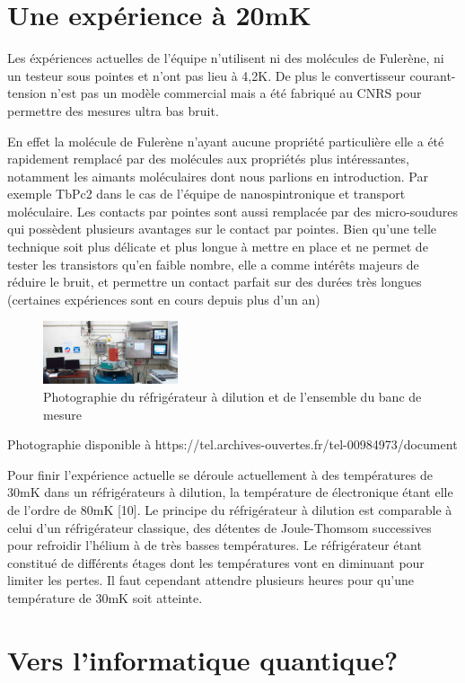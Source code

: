 \section{Une expérience à 20mK}
Les éxpériences actuelles de l’équipe n’utilisent ni des molécules de Fulerène, ni un testeur sous pointes et n’ont pas lieu à 4,2K. De plus le convertisseur courant-tension n’est pas un modèle commercial mais a été fabriqué au CNRS pour permettre des mesures ultra bas bruit.

En effet la molécule de Fulerène n’ayant aucune propriété particulière elle a été rapidement remplacé par des molécules aux propriétés plus intéressantes, notamment les aimants moléculaires dont nous parlions en introduction. Par exemple TbPc2 dans le cas de l’équipe de nanospintronique et transport moléculaire.
Les contacts par pointes sont aussi remplacée par des micro-soudures qui possèdent plusieurs avantages sur le contact par pointes. Bien qu’une telle technique soit plus délicate et plus longue à mettre en place et ne permet de tester les transistors qu’en faible nombre, elle a comme intérêts majeurs de réduire le bruit, et permettre un contact parfait sur des durées très longues (certaines expériences sont en cours depuis plus d’un an)

\begin{figure}[h]
    \begin{center}
        \includegraphics[width=150px]{Photos/Refrigerateur_dillution.png}
        \caption{Photographie du réfrigérateur à dilution et de l’ensemble du banc de mesure}
        \label{fig:}
    \end{center}
\end{figure}
Photographie disponible à https://tel.archives-ouvertes.fr/tel-00984973/document

Pour finir l’expérience actuelle se déroule actuellement à des températures de 30mK dans un réfrigérateurs à dilution, la température de électronique étant elle de l’ordre de 80mK [10]. Le principe du réfrigérateur à dilution est comparable à celui d’un réfrigérateur classique, des détentes de Joule-Thomsom successives pour refroidir l’hélium à de très basses températures. Le réfrigérateur étant constitué de différents étages dont les températures vont en diminuant pour limiter les pertes. Il faut cependant attendre plusieurs heures pour qu’une température de 30mK soit atteinte.
\section{Vers l'informatique quantique?}
